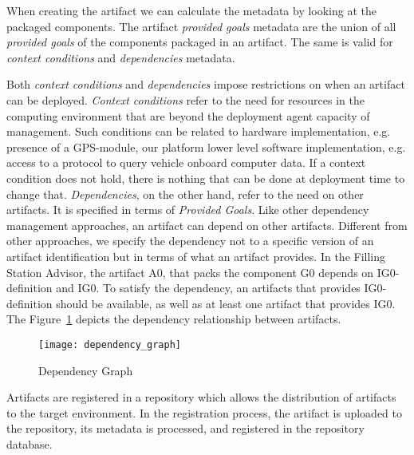 When creating the artifact we can calculate the metadata by looking at the packaged components. The artifact \emph{provided goals} metadata are the union of all \emph{provided goals} of the components packaged in an artifact. The same is valid for \emph{context conditions} and \emph{dependencies} metadata.

Both \emph{context conditions} and \emph{dependencies} impose restrictions on when an artifact can be deployed.
\emph{Context conditions} refer to the need for resources in the computing environment that are beyond the deployment agent capacity of management. Such conditions can be related to hardware implementation, e.g. presence of a GPS-module, our platform lower level software implementation, e.g. access to a protocol to query vehicle onboard computer data. If a context condition does not hold, there is nothing that can be done at deployment time to change that.
\emph{Dependencies}, on the other hand, refer to the need on other artifacts. It is specified in terms of \emph{Provided Goals}. Like other dependency management approaches, an artifact can depend on other artifacts.
Different from other approaches, we specify the dependency not to a specific version of an artifact identification but in terms of what an artifact provides.
In the Filling Station Advisor, the artifact A0, that packs the component G0 depends on IG0-definition and IG0. To satisfy the dependency, an artifacts that provides IG0-definition should be available, as well as at least one artifact that provides IG0. The Figure~\ref{fig:dependency_graph} depicts the dependency relationship between artifacts.

\begin{figure}[!htb]
  \centering
  \texttt{[image: dependency\_graph]}
  \caption{Dependency Graph}
  \label{fig:dependency_graph}
\end{figure}

Artifacts are registered in a repository which allows the distribution of artifacts to the target environment. In the registration process, the artifact is uploaded to the repository, its metadata is processed, and registered in the repository database.


